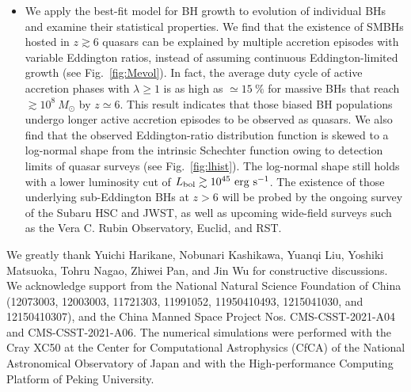 \documentclass[twocolumn, twocolappendix]{aastex63}
\newcommand{\Msun}{M_\odot}
\newcommand{\Muv}{M_{1450}}
\begin{document}
\begin{CJK*}{UTF8}{gbsn}
\begin{itemize}

\item
We apply the best-fit model for BH growth to evolution of individual BHs and examine their statistical properties.
We find that the existence of SMBHs hosted in $z\gtrsim 6$ quasars can be explained by
multiple accretion episodes with variable Eddington ratios, instead of assuming continuous Eddington-limited growth (see Fig.~\ref{fig:Mevol}).
In fact, the average duty cycle of active accretion phases with $\lambda \geq 1$ is as high as $\simeq 15~\%$
for massive BHs that reach $\gtrsim 10^8~\Msun$ by $z\simeq 6$.
This result indicates that those biased BH populations undergo longer active accretion episodes to be observed as quasars.
We also find that the observed Eddington-ratio distribution function is skewed to a log-normal shape from the intrinsic Schechter function
owing to detection limits of quasar surveys (see Fig.~\ref{fig:lhist}).
The log-normal shape still holds with a lower luminosity cut of $L_{\rm bol}\gtrsim 10^{45}~{\rm erg~s}^{-1}$.
The existence of those underlying sub-Eddington BHs at $z>6$ will be probed by the ongoing survey of the Subaru HSC and JWST,
as well as upcoming wide-field surveys such as the Vera C. Rubin Observatory, Euclid, and RST.
\end{itemize}

\acknowledgments
We greatly thank Yuichi Harikane, Nobunari Kashikawa, Yuanqi Liu, Yoshiki Matsuoka, Tohru Nagao, Zhiwei Pan, and Jin Wu for constructive discussions. 
We acknowledge support from the National Natural Science Foundation of China 
(12073003, 12003003, 11721303, 11991052, 11950410493, 1215041030, and 12150410307), 
and the China Manned Space Project Nos. CMS-CSST-2021-A04 and CMS-CSST-2021-A06. 
The numerical simulations were performed with the Cray XC50 at the Center for Computational Astrophysics (CfCA) 
of the National Astronomical Observatory of Japan and with the High-performance Computing Platform of Peking University.
%



\end{CJK*}
\end{document}
